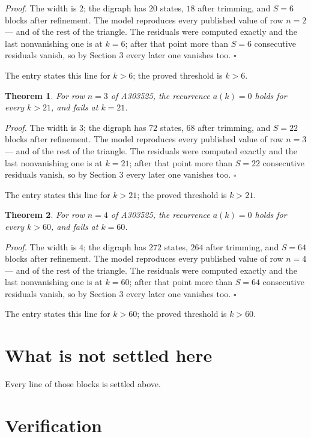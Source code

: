 \documentclass[11pt]{article}
\newtheorem{theorem}{Theorem}
\theoremstyle{definition}
\begin{document}
{\itshape Proof.} The width is $2$; the digraph has $20$ states, $18$ after trimming, and $S = 6$ blocks after refinement. The model reproduces every published value of row $n = 2$ --- and of the rest of the triangle. The residuals were computed exactly and the last nonvanishing one is at $k = 6$; after that point more than $S = 6$ consecutive residuals vanish, so by Section 3 every later one vanishes too. $\square$

The entry states this line for $k > 6$; the proved threshold is $k > 6$.

\begin{theorem} For row $n = 3$ of A303525, the recurrence $a(k) = 0$ holds for every $k > 21$, and fails at $k = 21$.\end{theorem}

{\itshape Proof.} The width is $3$; the digraph has $72$ states, $68$ after trimming, and $S = 22$ blocks after refinement. The model reproduces every published value of row $n = 3$ --- and of the rest of the triangle. The residuals were computed exactly and the last nonvanishing one is at $k = 21$; after that point more than $S = 22$ consecutive residuals vanish, so by Section 3 every later one vanishes too. $\square$

The entry states this line for $k > 21$; the proved threshold is $k > 21$.

\begin{theorem} For row $n = 4$ of A303525, the recurrence $a(k) = 0$ holds for every $k > 60$, and fails at $k = 60$.\end{theorem}

{\itshape Proof.} The width is $4$; the digraph has $272$ states, $264$ after trimming, and $S = 64$ blocks after refinement. The model reproduces every published value of row $n = 4$ --- and of the rest of the triangle. The residuals were computed exactly and the last nonvanishing one is at $k = 60$; after that point more than $S = 64$ consecutive residuals vanish, so by Section 3 every later one vanishes too. $\square$

The entry states this line for $k > 60$; the proved threshold is $k > 60$.

\section{What is not settled here}

Every line of those blocks is settled above.

\section{Verification}
\end{document}
